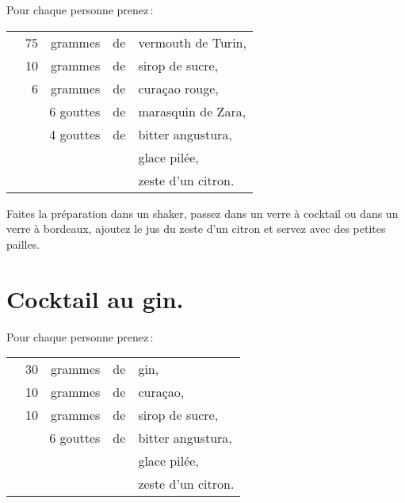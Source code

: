 Pour chaque personne prenez :

\footnotesize
\begin{longtable}{rrrrp{16em}}
  & 75 & grammes & de & vermouth de Turin,                                                                \\
  & 10 & grammes & de & sirop de sucre,                                                                   \\
  &  6 & grammes & de & curaçao rouge,                                                                    \\
  & \multicolumn{2}{r}{6 gouttes} & de & marasquin de Zara,                                               \\
  & \multicolumn{2}{r}{4 gouttes} & de & bitter angustura,                                                \\
  &    &         &    & glace pilée,                                                                      \\
  &    &         &    & zeste d'un citron.                                                                \\
\end{longtable}
\normalsize

Faites la préparation dans un shaker, passez dans un verre à cocktail ou dans
un verre à bordeaux, ajoutez le jus du zeste d'un citron et servez avec des
petites pailles.

\section*{\centering Cocktail au gin.}
{}

Pour chaque personne prenez :

\footnotesize
\begin{longtable}{rrrrp{16em}}
  & 30 & grammes & de & gin,                                                                              \\
  & 10 & grammes & de & curaçao,                                                                          \\
  & 10 & grammes & de & sirop de sucre,                                                                   \\
  & \multicolumn{2}{r}{6 gouttes} & de & bitter angustura,                                                \\
  &    &         &    & glace pilée,                                                                      \\
  &    &         &    & zeste d'un citron.                                                                \\
\end{longtable}
\normalsize

